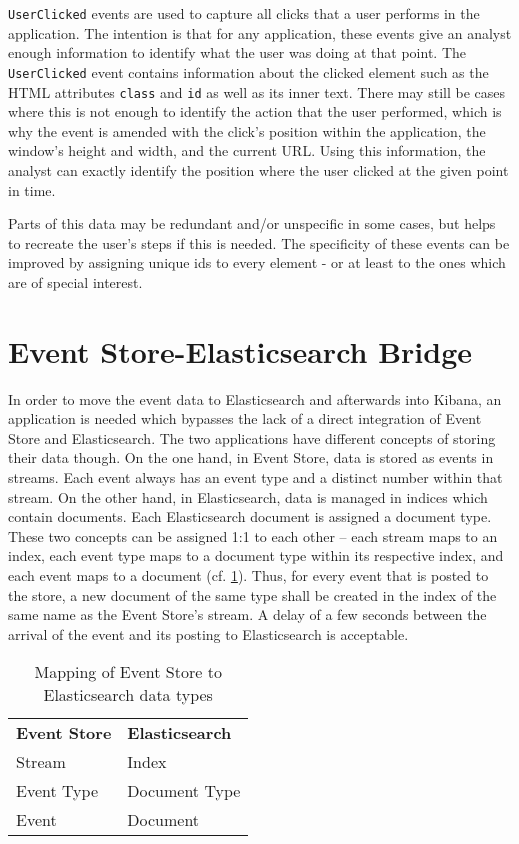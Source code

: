 \texttt{UserClicked} events are used to capture all clicks that a user performs in the application.
The intention is that for any application, these events give an analyst enough information to identify what the user was doing at that point.
The \texttt{UserClicked} event contains information about the clicked element such as the HTML attributes \texttt{class} and \texttt{id} as well as its inner text.
There may still be cases where this is not enough to identify the action that the user performed, which is why the event is amended with the click's position within the application, the window's height and width, and the current URL.
Using this information, the analyst can exactly identify the position where the user clicked at the given point in time.

Parts of this data may be redundant and/or unspecific in some cases, but helps to recreate the user's steps if this is needed.
The specificity of these events can be improved by assigning unique ids to every element - or at least to the ones which are of special interest.

\section{Event Store-Elasticsearch Bridge}
\label{sec:design:bridge}

In order to move the event data to Elasticsearch and afterwards into Kibana, an application is needed which bypasses the lack of a direct integration of Event Store and Elasticsearch.
The two applications have different concepts of storing their data though.
On the one hand, in Event Store, data is stored as events in streams.
Each event always has an event type and a distinct number within that stream.
On the other hand, in Elasticsearch, data is managed in indices which contain documents.
Each Elasticsearch document is assigned a document type.
These two concepts can be assigned 1:1 to each other -- each stream maps to an index, each event type maps to a document type within its respective index, and each event maps to a document (cf. \cref{table:design:bridge}).
Thus, for every event that is posted to the store, a new document of the same type shall be created in the index of the same name as the Event Store's stream.
A delay of a few seconds between the arrival of the event and its posting to Elasticsearch is acceptable.

\begin{table}[]
\centering
\caption{Mapping of Event Store to Elasticsearch data types}
\label{table:design:bridge}
\begin{tabular}{l|l}
\textbf{Event Store} & \textbf{Elasticsearch} \\ \cline{1-2}
Stream & Index \\
Event Type & Document Type \\
Event & Document
\end{tabular}
\end{table}

